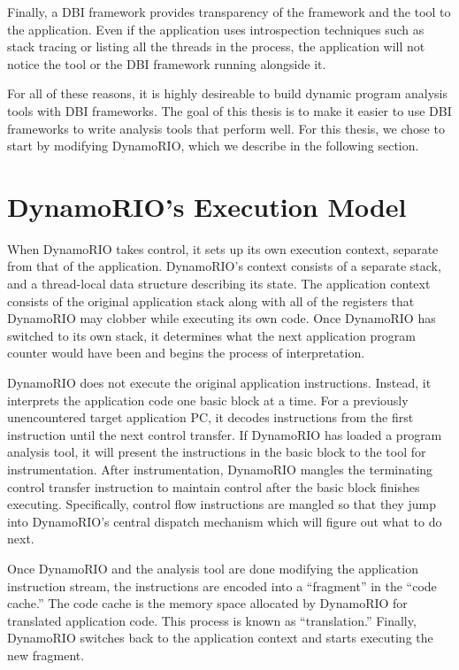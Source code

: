 Finally, a DBI framework provides transparency of the framework and the tool to
the application.  Even if the application uses introspection techniques such as
stack tracing or listing all the threads in the process, the application will
not notice the tool or the DBI framework running alongside it.

For all of these reasons, it is highly desireable to build dynamic program
analysis tools with DBI frameworks.  The goal of this thesis is to make it
easier to use DBI frameworks to write analysis tools that perform well.  For
this thesis, we chose to start by modifying DynamoRIO, which we describe in the
following section.

\section{DynamoRIO's Execution Model}

When DynamoRIO takes control, it sets up its own execution context, separate
from that of the application.  DynamoRIO's context consists of a separate stack,
and a thread-local data structure describing its state.  The application context
consists of the original application stack along with all of the registers that
DynamoRIO may clobber while executing its own code.  Once DynamoRIO has switched
to its own stack, it determines what the next application program counter would
have been and begins the process of interpretation.

DynamoRIO does not execute the original application instructions.  Instead, it
interprets the application code one basic block at a time.  For a previously
unencountered target application PC, it decodes instructions from the first
instruction until the next control transfer.  If DynamoRIO has loaded a program
analysis tool, it will present the instructions in the basic block to the tool
for instrumentation.  After instrumentation, DynamoRIO mangles the terminating
control transfer instruction to maintain control after the basic block finishes
executing.  Specifically, control flow instructions are mangled so that they
jump into DynamoRIO's central dispatch mechanism which will figure out what to
do next.

Once DynamoRIO and the analysis tool are done modifying the application
instruction stream, the instructions are encoded into a ``fragment'' in the
``code cache.'' The code cache is the memory space allocated by DynamoRIO for
translated application code.  This process is known as ``translation.'' Finally,
DynamoRIO switches back to the application context and starts executing the new
fragment.

